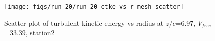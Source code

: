 \begin{figure}[H]
\centering
\texttt{[image: figs/run\_20/run\_20\_ctke\_vs\_r\_mesh\_scatter]}
\caption{Scatter plot of turbulent kinetic energy vs radius at $z/c$=6.97, $V_{free}$=33.39, station2}
\label{fig:run_20_ctke_vs_r_mesh_scatter}
\end{figure}


